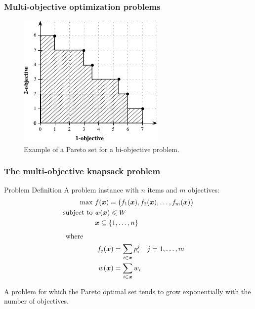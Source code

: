 \begin{frame}
\frametitle{Multi-objective optimization problems}
\begin{figure}
  \centering
  \includegraphics{img/pareto}
  \caption{Example of a Pareto set for a bi-objective problem.}
\end{figure}
\end{frame}

\begin{frame}
\frametitle{The multi-objective knapsack problem}
\begin{block}{Problem Definition}
A problem instance with $n$ items and $m$ objectives:
\begin{align*}
  \text{max   } & f(\boldsymbol{x}) =
    \big(f_1(\boldsymbol{x}) ,f_2(\boldsymbol{x}) ,\ldots ,f_{m}(\boldsymbol{x})\big) \\
  \text{subject to   } & w(\boldsymbol{x}) \leqslant W \\
  & \boldsymbol{x} \subseteq \{1, \ldots, n\}\\
\end{align*}
\pause
\vspace{-35pt}
\begin{align*}
  \text{where} \phantom{mmmmm} \\
  f_j(\boldsymbol{x}) &= \sum_{i \in \boldsymbol{x}} p^j_i \quad j = 1, \ldots, m\\
  w(\boldsymbol{x}) &= \sum_{i \in \boldsymbol{x}} w_i
\end{align*}
\end{block} \pause
A \nphard{} problem for which the Pareto optimal set
tends to grow exponentially with the number of objectives.
\end{frame}

